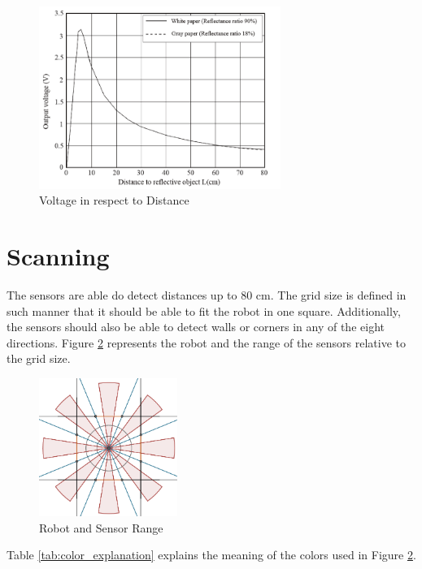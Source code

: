 \begin{figure}[htp]
	\centering
	\includegraphics[width=0.7\textwidth]{figures/scan/OutputVoltage.png}
	\caption{Voltage in respect to Distance}
	\label{fig:distance_voltage}
\end{figure}
\newpage
\section{Scanning}\label{sec:scanning}

The sensors are able do detect distances up to 80 cm. The grid size is 
defined in such manner that it should be able to fit the robot in one square. 
Additionally, the sensors should also be able to detect walls or corners in 
any of the eight directions.
Figure \ref{fig:robot} represents the robot and the range of the sensors relative
to the grid size.

\begin{figure}[htp]
	\centering
	\includegraphics[width=0.4\textwidth]{figures/scan/RangeCalc.png}
	\caption{Robot and Sensor Range}
	\label{fig:robot}
\end{figure} 

Table \ref{tab:color_explanation} explains the meaning of the colors used in Figure \ref{fig:robot}.

